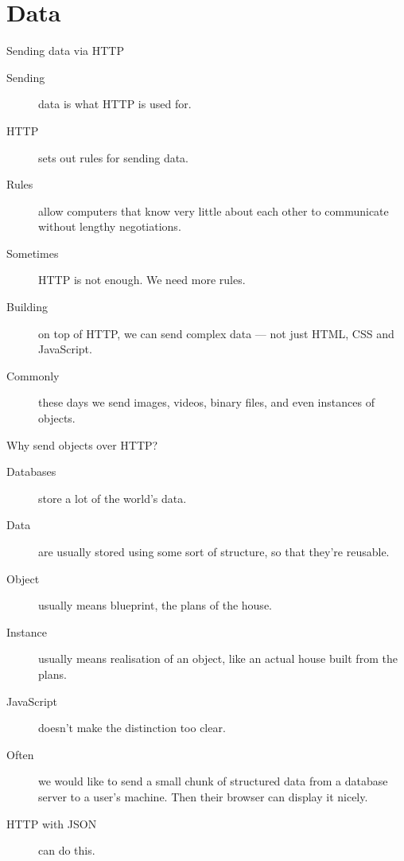 \section{Data}


\begin{frame}{Sending data via HTTP}
  \begin{description}
    \item[Sending] data is what HTTP is used for.
    \item[HTTP] sets out rules for sending data.
    \item[Rules] allow computers that know very little about each other to communicate without lengthy negotiations.
    \item[Sometimes] HTTP is not enough. We need more rules.
    \item[Building] on top of HTTP, we can send complex data --- not just HTML, CSS and JavaScript.
    \item[Commonly] these days we send images, videos, binary files, and even instances of objects.
  \end{description}
\end{frame}


\begin{frame}{Why send objects over HTTP?}
  \begin{description}
    \item[Databases] store a lot of the world's data.
    \item[Data] are usually stored using some sort of structure, so that they're reusable.
    \item[Object] usually means blueprint, the plans of the house.
    \item[Instance] usually means realisation of an object, like an actual house built from the plans.
    \item[JavaScript] doesn't make the distinction too clear.
    \item[Often] we would like to send a small chunk of structured data from a database server to a user's machine. Then their browser can display it nicely.
    \item[HTTP with JSON] can do this. 
  \end{description}
\end{frame}


